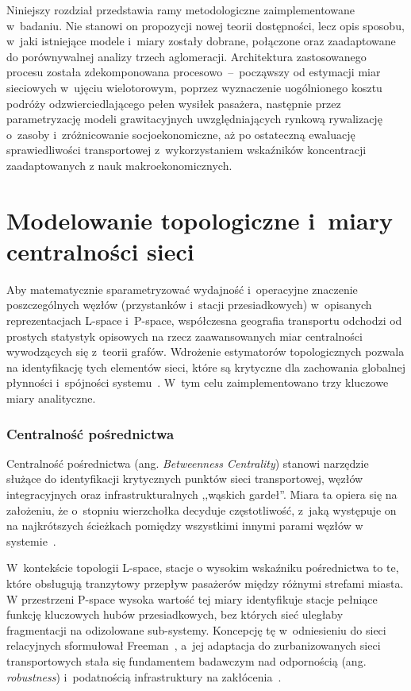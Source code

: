 \documentclass{pracamgr}
\begin{document}
Niniejszy rozdział przedstawia ramy metodologiczne zaimplementowane w~badaniu. Nie stanowi on propozycji nowej teorii dostępności, lecz opis sposobu, w~jaki istniejące modele i~miary zostały dobrane, połączone oraz zaadaptowane do porównywalnej analizy trzech aglomeracji. Architektura zastosowanego procesu została zdekomponowana procesowo~–~począwszy od estymacji miar sieciowych w~ujęciu wielotorowym, poprzez wyznaczenie uogólnionego kosztu podróży odzwierciedlającego pełen wysiłek pasażera, następnie przez parametryzację modeli grawitacyjnych uwzględniających rynkową rywalizację o~zasoby i~zróżnicowanie socjoekonomiczne, aż po ostateczną ewaluację sprawiedliwości transportowej z~wykorzystaniem wskaźników koncentracji zaadaptowanych z nauk makroekonomicznych.

\section{Modelowanie topologiczne i~miary centralności sieci}

Aby matematycznie sparametryzować wydajność i~operacyjne znaczenie poszczególnych węzłów (przystanków i~stacji przesiadkowych) w~opisanych reprezentacjach \mbox{L-space} i~\mbox{P-space}, współczesna geografia transportu odchodzi od prostych statystyk opisowych na rzecz zaawansowanych miar centralności wywodzących się z~teorii grafów. Wdrożenie estymatorów topologicznych pozwala na identyfikację tych elementów sieci, które są krytyczne dla zachowania globalnej płynności i~spójności systemu~\cite{LUO2019102505, gravity2, robustness, graph, characteristics}. W~tym celu zaimplementowano trzy kluczowe miary analityczne.

\subsubsection{Centralność pośrednictwa}

Centralność pośrednictwa (ang. \textit{Betweenness Centrality}) stanowi narzędzie służące do identyfikacji krytycznych punktów sieci transportowej, węzłów integracyjnych oraz infrastrukturalnych ,,wąskich gardeł''. Miara ta opiera się na założeniu, że o~stopniu wierzchołka decyduje częstotliwość, z~jaką występuje on na najkrótszych ścieżkach pomiędzy wszystkimi innymi parami węzłów w systemie~\cite{graph, characteristics}. 

W~kontekście topologii \mbox{L-space}, stacje o wysokim wskaźniku pośrednictwa to te, które obsługują tranzytowy przepływ pasażerów między różnymi strefami miasta. W przestrzeni \mbox{P-space} wysoka wartość tej miary identyfikuje stacje pełniące funkcję kluczowych hubów przesiadkowych, bez których sieć uległaby fragmentacji na odizolowane sub-systemy. Koncepcję tę w~odniesieniu do sieci relacyjnych sformułował Freeman~\cite{freeman}, a~jej adaptacja do zurbanizowanych sieci transportowych stała się fundamentem badawczym nad odpornością (ang. \textit{robustness}) i~podatnością infrastruktury na zakłócenia~\cite{multilayer}.
\end{document}
